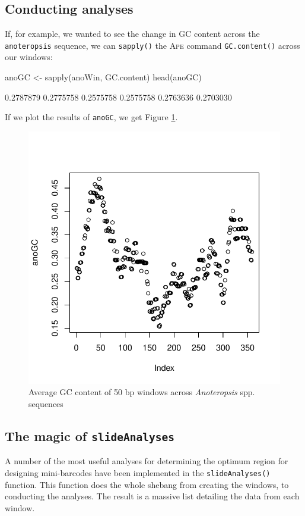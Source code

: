 \documentclass{article}
\newcommand{\progname}[1]{\textsc{#1}}
\newcommand{\fun}[1]{\texttt{#1}}
\begin{document}
\subsection{Conducting analyses}

If, for example, we wanted to see the change in GC content across the \fun{anoteropsis} sequence, we can \fun{sapply()} the \progname{Ape} command \fun{GC.content()} across our windows:

\begin{console}
anoGC <- sapply(anoWin, GC.content)
head(anoGC)
\end{console}
\begin{Routput}
[1] 0.2787879 0.2775758 0.2575758 0.2575758 0.2763636 0.2703030
\end{Routput}

If we plot the results of \fun{anoGC}, we get Figure \ref{slidWin.fig}.

\begin{figure}[tbp]
	\includegraphics{slidWin}
	\caption{Average GC content of 50 bp windows across \emph{Anoteropsis} spp. sequences}
	\label{slidWin.fig}
\end{figure}

\subsection{The magic of \fun{slideAnalyses}}
A number of the most useful analyses for determining the optimum region for designing mini-barcodes \citep{Meus.etal.2008} have been implemented in the \fun{slideAnalyses()} function. This function does the whole shebang from creating the windows, to conducting the analyses. The result is a massive list detailing the data from each window. %
\end{document}
